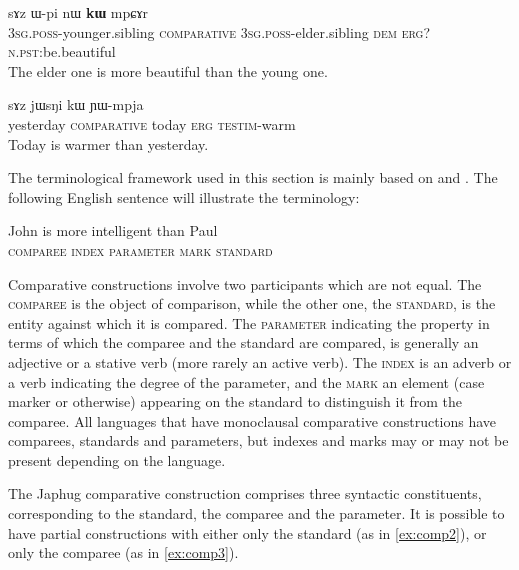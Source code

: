 \documentclass[oldfontcommands,oneside,a4paper,11pt]{article}
\newcommand{\ipa}[1]{{\phon #1}} %
\begin{document}
\begin{exe}
\ex \label{ex:comp1}
\gll  \ipa{ɯ-ʁi}   	\ipa{sɤz}   	\ipa{ɯ-pi}   	\ipa{nɯ}   	\ipa{\textbf{kɯ}}   	\ipa{mpɕɤr}     \\
\textsc{3sg.poss}-younger.sibling \textsc{comparative} \textsc{3sg.poss}-elder.sibling \textsc{dem} \textsc{erg?}  \textsc{n.pst:}be.beautiful \\
\glt The elder one is more beautiful than the young one.
\end{exe}
 
 
\begin{exe}
\ex \label{ex:comparative.complete}
\gll \ipa{jɯfɕɯr}   	\ipa{sɤz }   	\ipa{jɯsŋi}   	\ipa{kɯ}   	\ipa{ɲɯ-mpja}   \\
yesterday \textsc{comparative} today \textsc{erg} \textsc{testim}-warm \\
\glt Today is warmer than yesterday.
\end{exe}

The terminological framework used in this section is mainly based on \citet{dixon08comparative} and \citet{stassen11comparative}. The following English sentence will illustrate the  terminology:

\begin{exe}
\ex \label{ex:comp.eng}
\gll  John is more intelligent than Paul \\
\textsc{comparee} { } \textsc{index} \textsc{parameter} \textsc{mark} \textsc{standard}  \\
\end{exe}

Comparative constructions involve two participants which are not equal. The \textsc{comparee} is  the object of comparison, while the other one, the \textsc{standard}, is the entity against which it is compared. The \textsc{parameter} indicating the property in terms of which the comparee and the standard are compared, is generally an adjective or a stative verb (more rarely an active verb). The \textsc{index} is an adverb or a verb indicating the degree of the parameter, and the \textsc{mark} an element (case marker or otherwise) appearing on the standard to distinguish it from the comparee. All languages that have monoclausal comparative constructions have comparees, standards and parameters, but indexes and marks may or may not be present depending on the language.

 

The Japhug comparative construction comprises three syntactic constituents, corresponding to the standard, the comparee and the parameter. It is possible to have partial constructions with either only the standard (as in \ref{ex:comp2}), or only the comparee (as in \ref{ex:comp3}).
\end{document}

